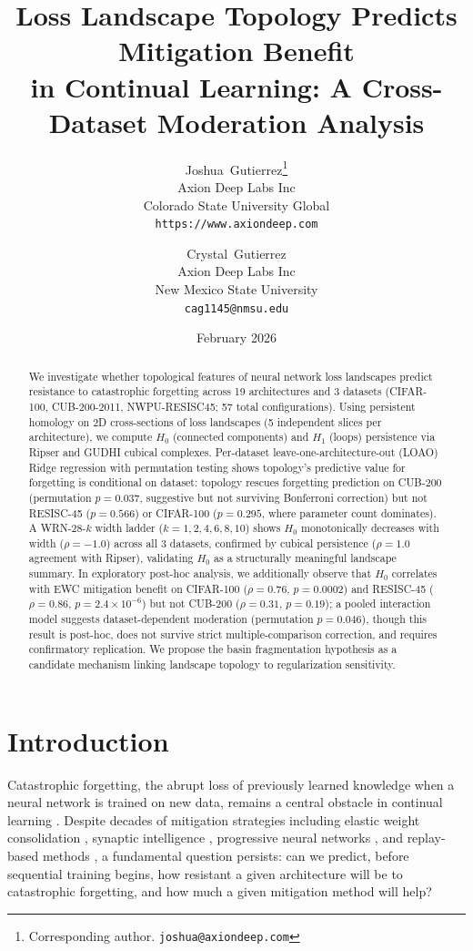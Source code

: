 \documentclass[10pt,twocolumn]{article}
\title{Loss Landscape Topology Predicts Mitigation Benefit\\in Continual Learning: A Cross-Dataset Moderation Analysis}
\author{
  Joshua~Gutierrez\thanks{Corresponding author. \texttt{joshua@axiondeep.com}} \\
  Axion Deep Labs Inc \\
  Colorado State University Global \\
  \texttt{https://www.axiondeep.com}
  \and
  Crystal~Gutierrez \\
  Axion Deep Labs Inc \\
  New Mexico State University \\
  \texttt{cag1145@nmsu.edu}
}
\date{February 2026}
\begin{document}
\maketitle

\begin{abstract}
We investigate whether topological features of neural network loss landscapes predict resistance to catastrophic forgetting across 19 architectures and 3 datasets (CIFAR-100, CUB-200-2011, NWPU-RESISC45; 57 total configurations). Using persistent homology on 2D cross-sections of loss landscapes (5 independent slices per architecture), we compute $H_0$ (connected components) and $H_1$ (loops) persistence via Ripser and GUDHI cubical complexes. Per-dataset leave-one-architecture-out (LOAO) Ridge regression with permutation testing shows topology's predictive value for forgetting is conditional on dataset: topology rescues forgetting prediction on CUB-200 (permutation $p = 0.037$, suggestive but not surviving Bonferroni correction) but not RESISC-45 ($p = 0.566$) or CIFAR-100 ($p = 0.295$, where parameter count dominates). A WRN-28-$k$ width ladder ($k = 1, 2, 4, 6, 8, 10$) shows $H_0$ monotonically decreases with width ($\rho = -1.0$) across all 3 datasets, confirmed by cubical persistence ($\rho = 1.0$ agreement with Ripser), validating $H_0$ as a structurally meaningful landscape summary. In exploratory post-hoc analysis, we additionally observe that $H_0$ correlates with EWC mitigation benefit on CIFAR-100 ($\rho = 0.76$, $p = 0.0002$) and RESISC-45 ($\rho = 0.86$, $p = 2.4 \times 10^{-6}$) but not CUB-200 ($\rho = 0.31$, $p = 0.19$); a pooled interaction model suggests dataset-dependent moderation (permutation $p = 0.046$), though this result is post-hoc, does not survive strict multiple-comparison correction, and requires confirmatory replication. We propose the basin fragmentation hypothesis as a candidate mechanism linking landscape topology to regularization sensitivity.
\end{abstract}

\section{Introduction}
\label{sec:intro}

Catastrophic forgetting, the abrupt loss of previously learned knowledge when a neural network is trained on new data, remains a central obstacle in continual learning \citep{mccloskey1989catastrophic, french1999catastrophic}. Despite decades of mitigation strategies including elastic weight consolidation \citep[EWC;][]{kirkpatrick2017overcoming}, synaptic intelligence \citep{zenke2017continual}, progressive neural networks \citep{rusu2016progressive}, and replay-based methods \citep{rebuffi2017icarl}, a fundamental question persists: can we predict, before sequential training begins, how resistant a given architecture will be to catastrophic forgetting, and how much a given mitigation method will help?
\end{document}
